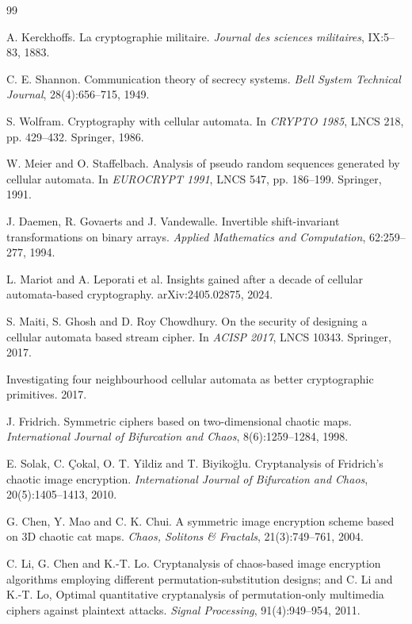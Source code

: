 \documentclass[11pt,a4paper]{article}
\theoremstyle{plain}
\theoremstyle{definition}
\theoremstyle{remark}
\begin{document}
\begin{thebibliography}{99}

 A. Kerckhoffs. La cryptographie militaire.
\emph{Journal des sciences militaires}, IX:5--83, 1883.

 C. E. Shannon. Communication theory of secrecy systems.
\emph{Bell System Technical Journal}, 28(4):656--715, 1949.

 S. Wolfram. Cryptography with cellular automata.
In \emph{CRYPTO 1985}, LNCS 218, pp. 429--432. Springer, 1986.

 W. Meier and O. Staffelbach. Analysis of pseudo random sequences
generated by cellular automata. In \emph{EUROCRYPT 1991}, LNCS 547, pp. 186--199.
Springer, 1991.

 J. Daemen, R. Govaerts and J. Vandewalle. Invertible shift-invariant
transformations on binary arrays. \emph{Applied Mathematics and Computation},
62:259--277, 1994.

 L. Mariot and A. Leporati et al. Insights gained after a decade of
cellular automata-based cryptography. arXiv:2405.02875, 2024.

 S. Maiti, S. Ghosh and D. Roy Chowdhury. On the security of designing
a cellular automata based stream cipher. In \emph{ACISP 2017}, LNCS 10343. Springer, 2017.

 Investigating four neighbourhood cellular automata as better cryptographic
primitives. 2017.

 J. Fridrich. Symmetric ciphers based on two-dimensional chaotic maps.
\emph{International Journal of Bifurcation and Chaos}, 8(6):1259--1284, 1998.

 E. Solak, C. Çokal, O. T. Yildiz and T. Biyikoğlu. Cryptanalysis of
Fridrich's chaotic image encryption. \emph{International Journal of Bifurcation and
Chaos}, 20(5):1405--1413, 2010.

 G. Chen, Y. Mao and C. K. Chui. A symmetric image encryption scheme
based on 3D chaotic cat maps. \emph{Chaos, Solitons \& Fractals}, 21(3):749--761, 2004.

 C. Li, G. Chen and K.-T. Lo. Cryptanalysis of chaos-based image
encryption algorithms employing different permutation-substitution designs; and
C. Li and K.-T. Lo, Optimal quantitative cryptanalysis of permutation-only multimedia
ciphers against plaintext attacks. \emph{Signal Processing}, 91(4):949--954, 2011.


\end{thebibliography}
\end{document}
